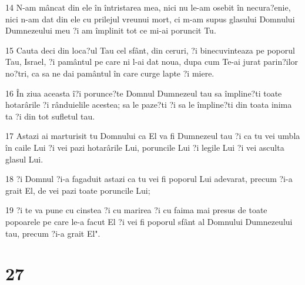 \par 14 N-am mâncat din ele în întristarea mea, nici nu le-am osebit în necura?enie, nici n-am dat din ele cu prilejul vreunui mort, ci m-am supus glasului Domnului Dumnezeului meu ?i am împlinit tot ce mi-ai poruncit Tu.
\par 15 Cauta deci din loca?ul Tau cel sfânt, din ceruri, ?i binecuvinteaza pe poporul Tau, Israel, ?i pamântul pe care ni l-ai dat noua, dupa cum Te-ai jurat parin?ilor no?tri, ca sa ne dai pamântul în care curge lapte ?i miere.
\par 16 În ziua aceasta î?i porunce?te Domnul Dumnezeul tau sa împline?ti toate hotarârile ?i rânduielile acestea; sa le paze?ti ?i sa le împline?ti din toata inima ta ?i din tot sufletul tau.
\par 17 Astazi ai marturisit tu Domnului ca El va fi Dumnezeul tau ?i ca tu vei umbla în caile Lui ?i vei pazi hotarârile Lui, poruncile Lui ?i legile Lui ?i vei asculta glasul Lui.
\par 18 ?i Domnul ?i-a fagaduit astazi ca tu vei fi poporul Lui adevarat, precum ?i-a grait El, de vei pazi toate poruncile Lui;
\par 19 ?i te va pune cu cinstea ?i cu marirea ?i cu faima mai presus de toate popoarele pe care le-a facut El ?i vei fi poporul sfânt al Domnului Dumnezeului tau, precum ?i-a grait El".

\chapter{27}

